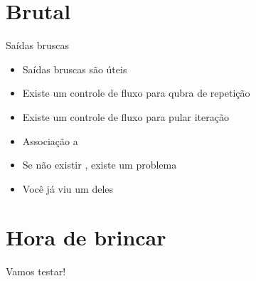 \documentclass[14pt]{beamer}
\begin{document}
		\begin{frame}
			
		\end{frame}

	\section{Brutal}
		\begin{frame}{Saídas bruscas}
			\begin{itemize}
				\presentationPause\item Saídas bruscas são úteis
				\presentationPause\item Existe um controle de fluxo para qubra de repetição
				\presentationPause\item Existe um controle de fluxo para pular iteração
				\presentationPause\item Associação a 
				\presentationPause\item Se não existir , existe um problema
				\presentationPause\item Você já viu um deles
			\end{itemize}
			\presentationPause
		\end{frame}

		\begin{frame}
			
		\end{frame}
		
	\section{Hora de brincar}
		\begin{frame}
			\begin{center}\Huge
				Vamos testar!
			\end{center}
		\end{frame}
\end{document}
